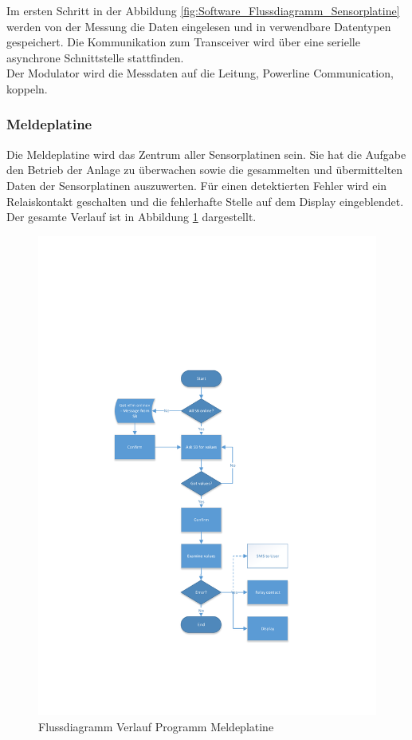 Im ersten Schritt in der Abbildung \ref{fig:Software_Flussdiagramm_Sensorplatine} werden von der Messung die Daten eingelesen und in verwendbare Datentypen gespeichert. Die Kommunikation zum Transceiver wird über eine serielle asynchrone Schnittstelle stattfinden. \\Der Modulator wird die Messdaten auf die Leitung, Powerline Communication, koppeln.

\subsubsection{Meldeplatine}
Die Meldeplatine wird das Zentrum aller Sensorplatinen sein. Sie hat die Aufgabe den Betrieb der Anlage zu überwachen sowie die gesammelten und übermittelten Daten der Sensorplatinen auszuwerten. Für einen detektierten Fehler wird ein Relaiskontakt geschalten und die fehlerhafte Stelle auf dem Display eingeblendet. Der gesamte Verlauf ist in Abbildung \ref{fig:Scheme_report_board} dargestellt.

\begin{figure}[htbp] 
  \centering
     \includegraphics[width=1\textwidth]{graphics/Scheme_report_board}
  \caption{Flussdiagramm Verlauf Programm Meldeplatine}
  \label{fig:Scheme_report_board}
\end{figure}

